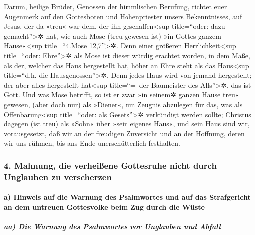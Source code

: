  Darum, heilige Brüder, Genossen der himmlischen Berufung,
richtet euer Augenmerk auf den Gottesboten und Hohenpriester unsers
Bekenntnisses, auf Jesus,  der da »treu« war dem, der ihn
geschaffen\textless sup title=``oder: dazu gemacht''\textgreater✲ hat,
wie auch Mose (treu gewesen ist) »in Gottes ganzem Hause«\textless sup
title=``4.Mose 12,7''\textgreater✲.  Denn einer größeren
Herrlichkeit\textless sup title=``oder: Ehre''\textgreater✲ als Mose ist
dieser würdig erachtet worden, in dem Maße, als der, welcher das Haus
hergestellt hat, höher an Ehre steht als das Haus\textless sup
title=``d.h. die Hausgenossen''\textgreater✲.  Denn jedes
Haus wird von jemand hergestellt; der aber alles hergestellt
hat\textless sup title=``=~der Baumeister des Alls''\textgreater✲, das
ist Gott.  Und was Mose betrifft, so ist er zwar »in
seinem✲ ganzen Hause treu« gewesen, (aber doch nur) als »Diener«, um
Zeugnis abzulegen für das, was als Offenbarung\textless sup
title=``oder: als Gesetz''\textgreater✲ verkündigt werden sollte;
 Christus dagegen (ist treu) als »Sohn« über »sein eigenes
Haus«, und sein Haus sind wir, vorausgesetzt, daß wir an der freudigen
Zuversicht und an der Hoffnung, deren wir uns rühmen, bis ans Ende
unerschütterlich festhalten.

\hypertarget{mahnung-die-verheiuxdfene-gottesruhe-nicht-durch-unglauben-zu-verscherzen}{%
\subsubsection{4. Mahnung, die verheißene Gottesruhe nicht durch
Unglauben zu
verscherzen}\label{mahnung-die-verheiuxdfene-gottesruhe-nicht-durch-unglauben-zu-verscherzen}}

\hypertarget{a-hinweis-auf-die-warnung-des-psalmwortes-und-auf-das-strafgericht-an-dem-untreuen-gottesvolke-beim-zug-durch-die-wuxfcste}{%
\paragraph{a) Hinweis auf die Warnung des Psalmwortes und auf das
Strafgericht an dem untreuen Gottesvolke beim Zug durch die
Wüste}\label{a-hinweis-auf-die-warnung-des-psalmwortes-und-auf-das-strafgericht-an-dem-untreuen-gottesvolke-beim-zug-durch-die-wuxfcste}}

\hypertarget{aa-die-warnung-des-psalmwortes-vor-unglauben-und-abfall}{%
\subparagraph{aa) Die Warnung des Psalmwortes vor Unglauben und
Abfall}\label{aa-die-warnung-des-psalmwortes-vor-unglauben-und-abfall}}

